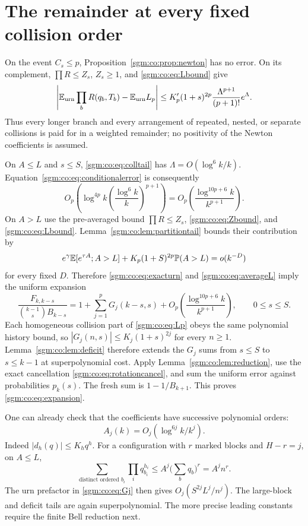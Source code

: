 \documentclass[11pt,letterpaper]{article}
\theoremstyle{remark}\newtheorem{remark}[theorem]{Remark}
\theoremstyle{definition}\newtheorem{definition}[theorem]{Definition}
\begin{document}
\section{The remainder at every fixed collision order}\label{sgm:co:sec:remainder}
On the event $C_s\le p$, Proposition~\ref{sgm:co:prop:newton} has no error. On its complement, $\prod R\le Z_s$, $Z_s\ge1$, and \eqref{sgm:co:eq:Lbound} give
\begin{equation}\label{sgm:co:eq:conditionalerror}
 \left|\mathbb E_{\rm urn}\prod_bR(q_b,T_b)-\mathbb E_{\rm urn}L_p\right|
 \le K'_p(1+s)^{2p}\frac{\Lambda^{p+1}}{(p+1)!}e^\Lambda.
\end{equation}
Thus every longer branch and every arrangement of repeated, nested, or separate collisions is paid for in a weighted remainder; no positivity of the Newton coefficients is assumed.

On $A\le L$ and $s\le S$, \eqref{sgm:co:eq:colltail} has $\Lambda=O(\log^6k/k)$. Equation~\eqref{sgm:co:eq:conditionalerror} is consequently
\[
 O_p\!\left(\log^{4p}k\left(\frac{\log^6k}{k}\right)^{p+1}\right)
 =O_p\!\left(\frac{\log^{10p+6}k}{k^{p+1}}\right).
\]
On $A>L$ use the pre-averaged bound $\prod R\le Z_s$, \eqref{sgm:co:eq:Zbound}, and \eqref{sgm:co:eq:Lbound}. Lemma~\ref{sgm:co:lem:partitiontail} bounds their contribution by
\[
 e^\gamma\mathbb E[e^{\tau A};A>L]
 +K_p(1+S)^{2p}\mathbb P(A>L)=o(k^{-D})
\]
for every fixed $D$. Therefore \eqref{sgm:co:eq:exacturn} and \eqref{sgm:co:eq:averageL} imply the uniform expansion
\begin{equation}\label{sgm:co:eq:rootexpansion}
 \frac{F_{k,k-s}}{\binom{k-1}{s}B_{k-s}}
 =1+\sum_{j=1}^pG_j(k-s,s)
 +O_p\!\left(\frac{\log^{10p+6}k}{k^{p+1}}\right),\qquad 0\le s\le S.
\end{equation}
Each homogeneous collision part of \eqref{sgm:co:eq:Lp} obeys the same polynomial history bound, so $|G_j(n,s)|\le K_j(1+s)^{2j}$ for every $n\ge1$. Lemma~\ref{sgm:co:lem:deficit} therefore extends the $G_j$ sums from $s\le S$ to $s\le k-1$ at superpolynomial cost. Apply Lemma~\ref{sgm:co:lem:reduction}, use the exact cancellation \eqref{sgm:co:eq:rotationcancel}, and sum the uniform error against probabilities $p_k(s)$. The fresh sum is $1-1/B_{k+1}$. This proves \eqref{sgm:co:eq:expansion}.

One can already check that the coefficients have successive polynomial orders:
\begin{equation}\label{sgm:co:eq:crudeAj}
 A_j(k)=O_j(\log^{6j}k/k^j).
\end{equation}
Indeed $|d_h(q)|\le K_hq^h$. For a configuration with $r$ marked blocks and $H-r=j$, on $A\le L$,
\[
 \sum_{\text{distinct ordered }b_i}\prod_iq_{b_i}^{h_i}
 \le A^j\Big(\sum_bq_b\Big)^r=A^jn^r.
\]
The urn prefactor in \eqref{sgm:co:eq:Gj} then gives $O_j(S^{2j}L^j/n^j)$. The large-block and deficit tails are again superpolynomial. The more precise leading constants require the finite Bell reduction next.
\end{document}
